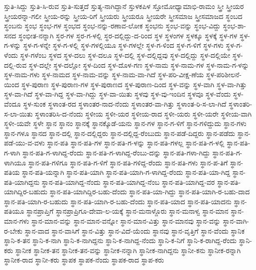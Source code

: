 ಸ್ತುತಿ-ಸಿದ್ದು
ಸ್ತುತಿ-ಸಿ-ರುವ
ಸ್ತುತಿ-ಸುತ್ತದೆ
ಸ್ತುತ್ಯ-ನಾಗಿದ್ದಾನೆ
ಸ್ತುಳಕಪಿಳ
ಸ್ತೋಮೋಧ್ಯಾಮಾಭಿ-ರಾಮಂ
ಸ್ತ್ರೀ
ಸ್ತ್ರೀಯರ
ಸ್ತ್ರೀಯರನ್ನಾ-ಗಲೀ
ಸ್ತ್ರೀಯ-ರನ್ನು
ಸ್ತ್ರೀಯ-ರಿಗೆ
ಸ್ತ್ರೀಯರು
ಸ್ತ್ರೀಯರೂ
ಸ್ತ್ರೀಯರೇ
ಸ್ತ್ರೀಸಮಾಜ
ಸ್ತ್ರೀಸಮಾಜದ
ಸ್ಥಂಬದ
ಸ್ಥಂಬನು
ಸ್ಥಂಭ
ಸ್ಥಂಭ-ಗಳ
ಸ್ಥಂಭದ
ಸ್ಥಂಭ-ನನ್ನು-ರಣಾವ-ಲೋಕ
ಸ್ಥಂಭನು
ಸ್ಥಂಭ-ವನ್ನು
ಸ್ಥಂಭ-ವಿದ್ದು
ಸ್ಥಂಭ-ಶಾ-ಸನದ
ಸ್ಥಂಭೀತ-ನನ್ನಾಗಿ
ಸ್ಥರ-ಗಳ
ಸ್ಥರ-ಗ-ಳಲ್ಲಿ
ಸ್ಥರ-ದಲ್ಲಿದ್ದು-ದ-ರಿಂದ
ಸ್ಥಳ
ಸ್ಥಳಂಗಳ
ಸ್ಥಳಕ್ಕೂ
ಸ್ಥಳಕ್ಕೆ
ಸ್ಥಳ-ಗಳ
ಸ್ಥಳ-ಗ-ಳನ್ನು
ಸ್ಥಳ-ಗ-ಳನ್ನೇ
ಸ್ಥಳ-ಗ-ಳಲ್ಲಿ
ಸ್ಥಳ-ಗಳಲ್ಲಿಯೂ
ಸ್ಥಳ-ಗಳಲ್ಲೇ
ಸ್ಥಳ-ಗ-ಳಿಂದ
ಸ್ಥಳ-ಗ-ಳಿಗೆ
ಸ್ಥಳ-ಗಳು
ಸ್ಥಳ-ಗ-ಳೆಂದು
ಸ್ಥಳ-ಗಳೆಂಬ
ಸ್ಥಳದ
ಸ್ಥಳ-ದಲು
ಸ್ಥಳ-ದಲೂ
ಸ್ಥಳ-ದಲ್ಲಿ
ಸ್ಥಳ-ದಲ್ಲಿದ್ದವು
ಸ್ಥಳ-ದಲ್ಲಿದ್ದು
ಸ್ಥಳ-ದಲ್ಲಿಯೇ
ಸ್ಥಳ-ದಲ್ಲಿ-ರುವ
ಸ್ಥಳ-ದಲ್ಲೇ
ಸ್ಥಳ-ದಲ್ಲೋ
ಸ್ಥಳ-ದಿಂದ
ಸ್ಥಳ-ದೊಳ-ಗಣ
ಸ್ಥಳ-ನಾಮ
ಸ್ಥಳ-ನಾಮ-ಗಳ
ಸ್ಥಳ-ನಾಮ-ಗ-ಳನ್ನು
ಸ್ಥಳ-ನಾಮ-ಗಳು
ಸ್ಥಳ-ನಾಮದ
ಸ್ಥಳ-ನಾಮ-ವನ್ನು
ಸ್ಥಳ-ನಾಮ-ವಾ-ಗಿದೆ
ಸ್ಥಳ-ಪರಿ-ವೀಕ್ಷ-ಣೆಯ
ಸ್ಥಳ-ಪರಿಶೀಲನೆ-ಯಿಂದ
ಸ್ಥಳ-ಪುರಾಣ
ಸ್ಥಳ-ಪುರಾಣ-ಗಳ
ಸ್ಥಳ-ಪುರಾಣದ
ಸ್ಥಳ-ಪುರಾಣ-ದಿಂದ
ಸ್ಥಳ-ವನ್ನು
ಸ್ಥಳ-ವಾಗಿ
ಸ್ಥಳ-ವಾ-ಗಿತ್ತು
ಸ್ಥಳ-ವಾ-ಗಿದೆ
ಸ್ಥಳ-ವಾ-ಗಿದ್ದ
ಸ್ಥಳ-ವಾ-ಗಿದ್ದು
ಸ್ಥಳ-ವಾ-ಯಿತು
ಸ್ಥಳವು
ಸ್ಥಳ-ವು-ಇಂದಿನ
ಸ್ಥಳವೂ
ಸ್ಥಳ-ವೆಂದು
ಸ್ಥಳ-ವೆಂದೂ
ಸ್ಥಳ-ಸುಂಕ
ಸ್ಥಳಾಂತ-ರದ
ಸ್ಥಳಾಂತರ-ನಾದ-ನೆಂದು
ಸ್ಥಳಾಂತರ-ವಾ-ಗಿತ್ತು
ಸ್ಥಳಾಂತ-ರಿ-ಸ-ಲಾ-ಗಿದೆ
ಸ್ಥಳಾಂತರಿ-ಸ-ಲಾ-ಯಿತು
ಸ್ಥಳಾಂತರಿಸಿ-ದ-ನೆಂದು
ಸ್ಥಳೀಯ
ಸ್ಥಳೀ-ಯರ
ಸ್ಥಳೀಯ-ರಾದ
ಸ್ಥಳೀ-ಯರು
ಸ್ಥಳೀ-ಯರೇ
ಸ್ಥಳೀಯ-ವಾಗಿ
ಸ್ಥಳೀ-ಯವೇ
ಸ್ಥಳೇ
ಸ್ಥಾನ
ಸ್ಥಾನಂ
ಸ್ಥಾನಕ್ಕೆ
ಸ್ಥಾನಕ್ಕೊಡೆ-ಯನು
ಸ್ಥಾನ-ಗಳ
ಸ್ಥಾನ-ಗ-ಳಿಗೆ
ಸ್ಥಾನ-ಗಳಿದ್ದುದು
ಸ್ಥಾನ-ಗಳು
ಸ್ಥಾನ-ಗಳೂ
ಸ್ಥಾನದ
ಸ್ಥಾನ-ದಲ್ಲಿ
ಸ್ಥಾನ-ದಲ್ಲಿದ್ದರು
ಸ್ಥಾನ-ದಲ್ಲಿದ್ದ-ರೆಂಬುದು
ಸ್ಥಾನ-ಪಡೆ-ದಿದ್ದರು
ಸ್ಥಾನ-ಪಡೆದು
ಸ್ಥಾನ-ಪಡೆ-ಯು-ವ-ವಳು
ಸ್ಥಾನ-ಪತಿ
ಸ್ಥಾನ-ಪತಿ-ಗಳ
ಸ್ಥಾನ-ಪತಿ-ಗ-ಳನ್ನು
ಸ್ಥಾನ-ಪತಿ-ಗಳಲ್ಲ
ಸ್ಥಾನ-ಪತಿ-ಗ-ಳಲ್ಲಿ
ಸ್ಥಾನ-ಪತಿ-ಗ-ಳಾಗಿ
ಸ್ಥಾನ-ಪತಿ-ಗ-ಳಾಗಿದ್ದ-ರೆಂದು
ಸ್ಥಾನ-ಪತಿ-ಗ-ಳಾಗಿದ್ದ-ರೆಂಬು-ದನ್ನು
ಸ್ಥಾನ-ಪತಿ-ಗಳಾ-ಗಿದ್ದು
ಸ್ಥಾನ-ಪತಿ-ಗ-ಳಾಗಿಯೂ
ಸ್ಥಾನ-ಪತಿ-ಗಳಿಗೂ
ಸ್ಥಾನ-ಪತಿ-ಗ-ಳಿಗೆ
ಸ್ಥಾನ-ಪತಿ-ಗಳಿದ್ದ-ರೆಂದು
ಸ್ಥಾನ-ಪತಿ-ಗಳು
ಸ್ಥಾನ-ಪ-ತಿಗೆ
ಸ್ಥಾನ-ಪತಿಯ
ಸ್ಥಾನ-ಪತಿ-ಯನ್ನಾಗಿ
ಸ್ಥಾನ-ಪತಿ-ಯಾಗಿ
ಸ್ಥಾನ-ಪತಿ-ಯಾಗಿ-ಗ-ಳಾಗಿದ್ದ-ರೆಂದು
ಸ್ಥಾನ-ಪತಿ-ಯಾ-ಗಿದ್ದ
ಸ್ಥಾನ-ಪತಿ-ಯಾಗಿದ್ದನು
ಸ್ಥಾನ-ಪತಿ-ಯಾಗಿದ್ದ-ನೆಂದು
ಸ್ಥಾನ-ಪತಿ-ಯಾಗಿದ್ದ-ನೆಂಬ
ಸ್ಥಾನ-ಪತಿ-ಯಾಗಿದ್ದ-ವರ
ಸ್ಥಾನ-ಪತಿ-ಯಾಗಿದ್ದಿರ-ಬಹುದು
ಸ್ಥಾನ-ಪತಿ-ಯಾಗಿದ್ದಿರ-ಬಹು-ದೆಂದು
ಸ್ಥಾನ-ಪತಿ-ಯಾ-ಗಿದ್ದು
ಸ್ಥಾನ-ಪತಿ-ಯಾಗಿ-ರ-ಬಹು-ದಾದ
ಸ್ಥಾನ-ಪತಿ-ಯಾಗಿ-ರ-ಬಹುದು
ಸ್ಥಾನ-ಪತಿ-ಯಾಗಿ-ರ-ಬಹು-ದೆಂದು
ಸ್ಥಾನ-ಪತಿ-ಯಾದ
ಸ್ಥಾನ-ಪತಿ-ಯಾದನು
ಸ್ಥಾನ-ಪತಿಯೂ
ಸ್ಥಾನಪ್ರಾಪ್ತಿಗೆ
ಸ್ಥಾನಪ್ರಾಪ್ರಿಗೂ-ದೇವಾ-ಲ-ಯಕ್ಕೆ
ಸ್ಥಾನ-ಮನಾಳ್ದೊರು
ಸ್ಥಾನ-ಮನಾಳ್ವ
ಸ್ಥಾನ-ಮಾನ
ಸ್ಥಾನ-ಮಾನ-ಗಳು
ಸ್ಥಾನ-ಮಾನ-ವನ್ನು
ಸ್ಥಾನ-ಮಾನ-ವನ್ನೋ
ಸ್ಥಾನ-ಮಾನ-ವಿತ್ತು
ಸ್ಥಾನ-ಮಾನವು
ಸ್ಥಾನ-ವನ್ನು
ಸ್ಥಾನ-ವಾಗಿ-ರ-ಬೇಕು
ಸ್ಥಾನ-ವಾದ
ಸ್ಥಾನ-ವಾಸಿಗೆ
ಸ್ಥಾನ-ವಿತ್ತು
ಸ್ಥಾನ-ವಿದೆ-ಯೆಂದು
ಸ್ಥಾನವು
ಸ್ಥಾನ-ವೃತ್ತಿಗೆ
ಸ್ಥಾನ-ವೆಂದು
ಸ್ಥಾನಿಕ
ಸ್ಥಾನಿ-ಕ-ತನ
ಸ್ಥಾನಿ-ಕ-ನಾಗಿ
ಸ್ಥಾನಿ-ಕ-ನಾಗಿದ್ದನು
ಸ್ಥಾನಿ-ಕ-ನಾಗಿದ್ದ-ನೆಂದು
ಸ್ಥಾನಿ-ಕ-ನಿಗೆ
ಸ್ಥಾನಿ-ಕ-ರಾಗಿದ್ದ-ರೆಂದು
ಸ್ಥಾನಿ-ಕರು
ಸ್ಥಾನೀಕ
ಸ್ಥಾನೀಕ-ತನ
ಸ್ಥಾನೀಕ-ತನ-ವನ್ನು
ಸ್ಥಾನೀಕ-ನನ್ನಾಗಿ
ಸ್ಥಾನೀಕ-ನಾಗಿದ್ದನು
ಸ್ಥಾನೀ-ಕನು
ಸ್ಥಾನೀಕ-ರನ್ನಾಗಿ
ಸ್ಥಾನೀಕ-ರಾದ
ಸ್ಥಾನೀ-ಕರು
ಸ್ಥಾಪಕ
ಸ್ಥಾಪಕ-ನೆಂದು
ಸ್ಥಾಪಕ-ರಾದ
ಸ್ಥಾಪ-ಕರು
